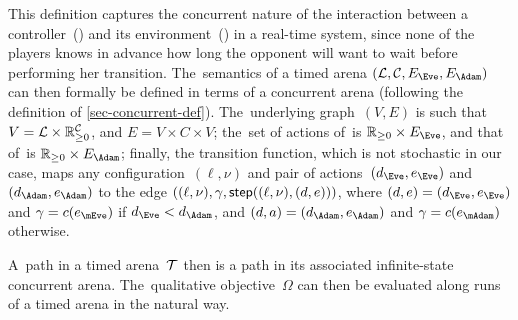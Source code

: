 

This definition captures the concurrent nature of the interaction
between a controller~(\Eve) and its environment~(\Adam) in a real-time
system, since none of the players knows in advance how long the
opponent will want to wait before performing her transition.
The~semantics of a timed arena $(\Locs, \Clocks,\EE,\EA)$ can then
formally be defined in terms of a concurrent arena (following the
definition of \cref{sec-concurrent-def}).  The~underlying
graph~$(V,E)$ is such that $V=\mathcal{L}\times \mathbb{R}_{\geq 0}^{\mathcal{C}}$, and $E=
V\times C\times V$; the~set of actions of~\Eve is $\Realnn\times\EE$, and that
of~\Adam is $\Realnn\times\EA$; finally, the transition function,
which is not stochastic in our case, maps any
configuration~$(\ell,\nu)$ and pair of actions~$(d_\Eve,e_\Eve)$ and
$(d_\Adam,e_\Adam)$ to the edge $((\ell,\nu),\gamma,
\mathsf{step}((\ell,\nu),(d,e)))$, where $(d,e)=(d_\Eve,e_\Eve)$ and $\gamma=c(e_\mEve)$
if
$d_\Eve<d_\Adam$,  and $(d,a)=(d_\Adam,e_\Adam)$ and $\gamma=c(e_\mAdam)$ otherwise.

A~path in a timed arena~$\mathcal T$ then is a path in its
associated infinite-state concurrent arena. The~qualitative
objective~$\Omega$ can then be evaluated along runs of a timed arena in
the natural way.



